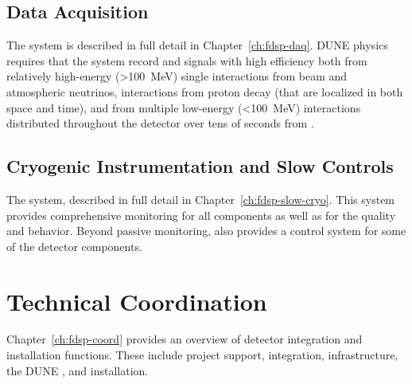 \subsection{Data Acquisition}
\label{sec:fdsp-ov-daq}

The  system is described in full detail in Chapter~\ref{ch:fdsp-daq}.
DUNE physics requires that the  system record  and  signals with high efficiency both from relatively high-energy (>\SI{100}{MeV}) single interactions from beam and atmospheric neutrinos, interactions from proton decay (that are localized in both space and time), and from multiple low-energy (<\SI{100}{MeV}) interactions distributed throughout the detector over tens of seconds from .
\subsection{Cryogenic Instrumentation and Slow Controls}
\label{sec:fdsp-ov-instr}

The  system, described in full detail in Chapter~\ref{ch:fdsp-slow-cryo}.
This system provides comprehensive monitoring for all  components as well as for the \lar quality and behavior.  Beyond passive monitoring,  also provides a control system for some of the detector components.

\section{Technical Coordination}
\label{sec:fdsp-ov-tc}
Chapter~\ref{ch:fdsp-coord} provides an overview of detector integration and installation functions. These include project support, integration, infrastructure, the DUNE , and installation.

